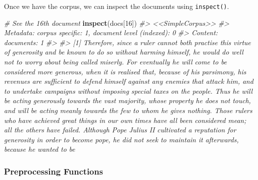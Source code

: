 \documentclass[]{book}
\newenvironment{Shaded}{\begin{snugshade}}{\end{snugshade}}
\newcommand{\KeywordTok}[1]{\textcolor[rgb]{0.13,0.29,0.53}{\textbf{#1}}}
\newcommand{\DataTypeTok}[1]{\textcolor[rgb]{0.13,0.29,0.53}{#1}}
\newcommand{\DecValTok}[1]{\textcolor[rgb]{0.00,0.00,0.81}{#1}}
\newcommand{\StringTok}[1]{\textcolor[rgb]{0.31,0.60,0.02}{#1}}
\newcommand{\CommentTok}[1]{\textcolor[rgb]{0.56,0.35,0.01}{\textit{#1}}}
\newcommand{\OtherTok}[1]{\textcolor[rgb]{0.56,0.35,0.01}{#1}}
\newcommand{\OperatorTok}[1]{\textcolor[rgb]{0.81,0.36,0.00}{\textbf{#1}}}
\newcommand{\NormalTok}[1]{#1}
\begin{document}
\begin{Shaded}
\end{Shaded}

Once we have the corpus, we can inspect the documents using
\texttt{inspect()}.

\begin{Shaded}
\begin{Highlighting}[]
\CommentTok{# See the 16th document}
\KeywordTok{inspect}\NormalTok{(docs[}\DecValTok{16}\NormalTok{])}
\CommentTok{#> <<SimpleCorpus>>}
\CommentTok{#> Metadata:  corpus specific: 1, document level (indexed): 0}
\CommentTok{#> Content:  documents: 1}
\CommentTok{#> }
\CommentTok{#> [1]  Therefore, since a ruler cannot both practise this virtue of generosity and be known to do so without harming himself, he would do well not to worry about being called miserly. For eventually he will come to be considered more generous, when it is realised that, because of his parsimony, his revenues are sufficient to defend himself against any enemies that attack him, and to undertake campaigns without imposing special taxes on the people. Thus he will be acting generously towards the vast majority, whose property he does not touch, and will be acting meanly towards the few to whom he gives nothing.  Those rulers who have achieved great things in our own times have all been considered mean; all the others have failed. Although Pope Julius II cultivated a reputation for generosity in order to become pope, he did not seek to maintain it afterwards, because he wanted to be}
\end{Highlighting}
\end{Shaded}

\subsubsection*{Preprocessing Functions}\label{preprocessing-functions}
\end{document}
